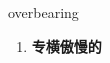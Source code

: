
\begin{frame}
{\huge overbearing}
\begin{center}
\begin{enumerate}\Large
  \item \textbf{专横傲慢的}
\end{enumerate}
\end{center}
\end{frame}
